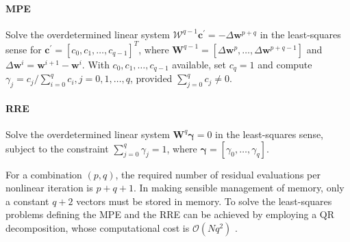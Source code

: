           \paragraph{MPE}

          Solve the overdetermined linear system \(\mathscr W^{q-1} \mathbf{c}^{\prime}=-\Delta \mathbf{w}^{p+q}\) in the least-squares sense for \(\mathbf{c}^{\prime}=\left[c_{0}, c_{1}, \ldots, c_{q-1}\right]^{T}\), where \(\mathbf{W}^{q-1} = [\Delta \mathbf{w}^{p}, \dots, \Delta \mathbf{w}^{p+q-1}]\) and \(\Delta \mathbf{w}^i = \mathbf{w}^{i+1} - \mathbf{w}^i\).
          With \(c_{0}, c_{1}, \ldots, c_{q-1}\) available, set \(c_{q}=1\) and compute \(\gamma_{j}=c_{j} / \sum_{i=0}^{q} c_{i}, j=0,1, \ldots, q\), provided \(\sum_{j=0}^{q} c_{j} \neq 0\).

          \paragraph{RRE}

          Solve the overdetermined linear system \(\mathbf{W}^{q} \boldsymbol\gamma=0\) in the least-squares sense, subject to the constraint \(\sum_{j=0}^{q} \gamma_{j}=1\), where \(\boldsymbol\gamma = [\gamma_0, \dots, \gamma_q]\).

          \bigskip

          For a combination \((p,q)\), the required number of residual evaluations per nonlinear iteration is \(p+q+1\).
          In making sensible management of memory, only a constant \(q+2\) vectors must be stored in memory.
          To solve the least-squares problems defining the MPE and the RRE can be achieved by employing a QR decomposition, whose computational cost is \(\mathcal O(Nq^2)\) \citep{sidi_vector_2017}.

